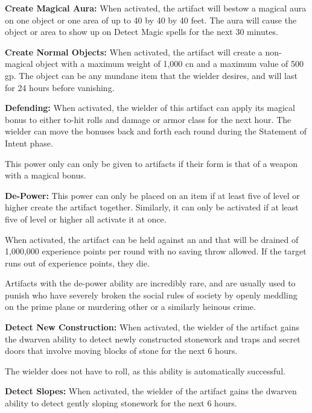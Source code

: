 \begin{multicols*}{2}
\textbf{Create Magical Aura:} When activated, the artifact will bestow a magical aura on one object or one area of up to 40 by 40 by 40 feet. The aura will cause the object or area to show up on Detect Magic spells for the next 30 minutes.

\textbf{Create Normal Objects:} When activated, the artifact will create a non-magical object with a maximum weight of 1,000 cn and a maximum value of 500 gp. The object can be any mundane item that the wielder desires, and will last for 24 hours before vanishing.

\textbf{Defending:} When activated, the wielder of this artifact can apply its magical bonus to either to-hit rolls and damage or armor class for the next hour. The wielder can move the bonuses back and forth each round during the Statement of Intent phase.

This power only can only be given to artifacts if their form is that of a weapon with a magical bonus.

\textbf{De-Power:} This power can only be placed on an item if at least five  of  level or higher create the artifact together. Similarly, it can only be activated if at least five  of  level or higher all activate it at once.

When activated, the artifact can be held against an  and that  will be drained of 1,000,000 experience points per round with no saving throw allowed. If the target runs out of experience points, they die.

Artifacts with the de-power ability are incredibly rare, and are usually used to punish  who have severely broken the social rules of  society by openly meddling on the prime plane or murdering other  or a similarly heinous crime.

\textbf{Detect New Construction:} When activated, the wielder of the artifact gains the dwarven ability to detect newly constructed stonework and traps and secret doors that involve moving blocks of stone for the next 6 hours.

The wielder does not have to roll, as this ability is automatically successful.

\textbf{Detect Slopes:} When activated, the wielder of the artifact gains the dwarven ability to detect gently sloping stonework for the next 6 hours.


\end{multicols*}
